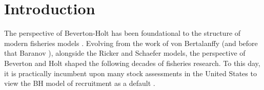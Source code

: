 %
\section{Introduction\label{schnuteInt}}

%
The perspective of Beverton-Holt \cite{beverton_dynamics_1957} has been 
foundational to the structure of modern fisheries models \cite{holden_beverton_1995}. 
Evolving from the work of von Bertalanffy \cite{von_bertalanffy_quantitative_1938} (and before that Baranov \cite{baranov_question_1918, sharov_unknown_2021}), 
alongside the Ricker \cite{ricker_stock_1954} and Schaefer \cite{schaefer_study_1957}   
models, the perspective of Beverton and Holt shaped the following decades of fisheries 
research. To this day, it is practically incumbent upon many stock assessments in the United States 
to view the BH model of recruitment as a default \cite{methot_stock_2013, dick_stock_2023}. %



